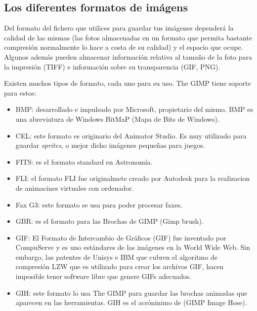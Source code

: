 \subsection{Los diferentes formatos de imágens}

Del  formato  del  fichero  que utilices  para  guardar  tus  imágenes
dependerá  la calidad  de  las  mismas (las  fotos  almacenadas en  un
formato que permita bastante compresión normalmente lo hace a costa de
su calidad)  y el espacio  que ocupe. Algunos además  pueden almacenar
información relativa al  tamaño de la foto para la  impresión (TIFF) e
información sobre su transparencia (GIF, PNG).

Existen muchos tipos de formato, cada uno para su uso.
The {\sf GIMP} tiene soporte para estos:

\begin{itemize}

\item  BMP: desarrollado  e impulsado  por Microsoft,  propietario del
mismo.  BMP es  una abreviatura  de Windows  BitMaP (Mapa  de Bits  de
Windows).

\item  CEL: este  formato es  originario del  Animator Studio.  Es muy
utilizado para guardar {\em sprites},  o mejor dicho imágenes pequeñas
para juegos.

\item FITS: es el formato standard en Astronomía.

\item FLI: el formato FLI fue originalmete creado por Autodesk para 
la realizacion de animacines virtuales con ordenador.

\item Fax G3: este formato se usa para poder procesar faxes.

\item GBR: es el formato para las Brochas de {\sf GIMP} (Gimp brush). 

\item GIF: El  Formato de Intercambio de Gráficos  (GIF) fue inventado
por CompuServe  y es uno estándares  de las imágenes en  la World Wide
Web. Sin embargo, las patentes de Unisys e IBM que cubren el algoritmo
de compresión LZW que es utilizado  para crear los archivos GIF, hacen
imposible tener software libre que genere GIFs adecuados.

\item GIH: este formato lo usa {\sf The GIMP} para guardar las brochas
animadas que  aparecen en  las herramientas. GIH  es el  acróninimo de
(GIMP Image Hose).


\end{itemize}
